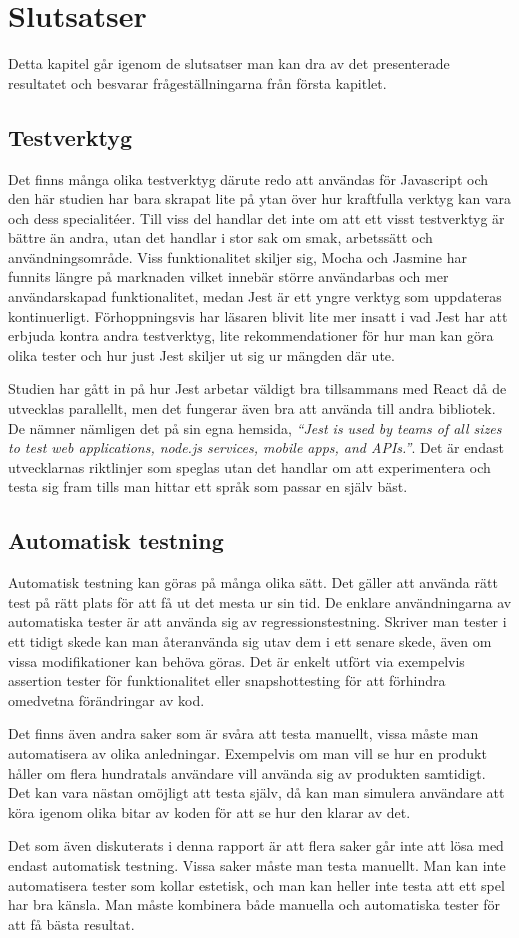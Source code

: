 \section{Slutsatser}
\label{sec:david-conclusion}
Detta kapitel går igenom de slutsatser man kan dra av det presenterade resultatet och besvarar frågeställningarna från första kapitlet.
\subsection{Testverktyg}
Det finns många olika testverktyg därute redo att användas för Javascript och den här studien har bara skrapat lite på ytan över hur kraftfulla verktyg kan vara och dess specialitéer. Till viss del handlar det inte om att ett visst testverktyg är bättre än andra, utan det handlar i stor sak om smak, arbetssätt och användningsområde. Viss funktionalitet skiljer sig, Mocha och Jasmine har funnits längre på marknaden vilket innebär större användarbas och mer användarskapad funktionalitet, medan Jest är ett yngre verktyg som uppdateras kontinuerligt. Förhoppningsvis har läsaren blivit lite mer insatt i vad Jest har att erbjuda kontra andra testverktyg, lite rekommendationer för hur man kan göra olika tester och hur just Jest skiljer ut sig ur mängden där ute. 

Studien har gått in på hur Jest arbetar väldigt bra tillsammans med React då de utvecklas parallellt, men det fungerar även bra att använda till andra bibliotek. De nämner nämligen det på sin egna hemsida, \textit{``Jest is used by teams of all sizes to test web applications, node.js services, mobile apps, and APIs.''}\cite{bib-jest}.  Det är endast utvecklarnas riktlinjer som speglas utan det handlar om att experimentera och testa sig fram tills man hittar ett språk som passar en själv bäst. 

\subsection{Automatisk testning}
Automatisk testning kan göras på många olika sätt. Det gäller att använda rätt test på rätt plats för att få ut det mesta ur sin tid. De enklare användningarna av automatiska tester är att använda sig av regressionstestning. Skriver man tester i ett tidigt skede kan man återanvända sig utav dem i ett senare skede, även om vissa modifikationer kan behöva göras. Det är enkelt utfört via exempelvis assertion tester för funktionalitet eller snapshottesting för att förhindra omedvetna förändringar av kod. 

Det finns även andra saker som är svåra att testa manuellt, vissa måste man automatisera av olika anledningar. Exempelvis om man vill se hur en produkt håller om flera hundratals användare vill använda sig av produkten samtidigt. Det kan vara nästan omöjligt att testa själv, då kan man simulera användare att köra igenom olika bitar av koden för att se hur den klarar av det.

Det som även diskuterats i denna rapport är att flera saker går inte att lösa med endast automatisk testning. Vissa saker måste man testa manuellt. Man kan inte automatisera tester som kollar estetisk, och man kan heller inte testa att ett spel har bra känsla. Man måste kombinera både manuella och automatiska tester för att få bästa resultat.